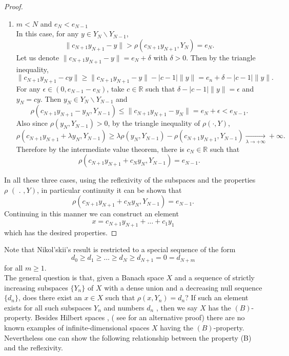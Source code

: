 \documentclass[12pt, reqno]{amsart}
\theoremstyle{definition}
\theoremstyle{remark}
\numberwithin{equation}{section}
\begin{document}
\begin{proof}
\begin{enumerate}
In this case, taking $c_N=1$, we directly get
$$
\rho(c_{N+1}y_{N+1} + c_Ny_N, Y_N ) = \rho(c_{N+1}y_{N+1} + y_N, Y_N )=e_N=e_{N-1}.
$$
\item $m < N$ and $e_N < e_{N-1}$\\

In this case, for any $y\in Y_N\backslash Y_{N-1}$, 
$$
\|c_{N+1}y_{N+1}-y\|>\rho(c_{N+1}y_{N+1},Y_N)=e_N.
$$
Let us denote $\|c_{N+1}y_{N+1}-y\|=e_N+\delta$ with $\delta>0$. Then by the triangle inequality,
$$
\|c_{N+1}y_{N+1}-cy\|\ge \|c_{N+1}y_{N+1}-y\|-|c-1|\|y\|=e_n+\delta-|c-1|\|y\|.
$$
For any $\epsilon\in(0,e_{N-1}-e_N)$, take $c\in\mathbb R$ such that $\delta-|c-1|\|y\|=\epsilon$ and $y_N=cy$.  
Then $y_N\in Y_N\backslash Y_{N-1}$ and
$$
\rho(c_{N+1}y_{N+1}-y_N,Y_{N-1})\le \|c_{N+1}y_{N+1}-y_N\|=e_N+\epsilon<e_{N-1}.
$$
Also since $\rho(y_N, Y_{N-1} )>0$, by the triangle inequality of $\rho(\cdot,Y)$, 
$$
 \rho(c_{N+1}y_{N+1}+\lambda y_N, Y_{N-1} )\ge  \lambda \rho(y_N, Y_{N-1} )- \rho(c_{N+1}y_{N+1}, Y_{N-1} )\xrightarrow[\lambda\to+\infty]{}+\infty.
$$
Therefore by the intermediate value theorem, there is $c_{N}\in\mathbb R$ such that
$$
\rho(c_{N+1}y_{N+1}+c_N y_N, Y_{N-1} )=e_{N-1}.
$$
\end{enumerate}

In all these three cases, using  the reflexivity of the subspaces  and the properties  $\rho\,\,(\,\, .\,\, , Y)$,  in particular continuity  it can be shown that $$\rho(c_{N+1} y_{N+1}+c_Ny_N, Y_{N-1} )= e_{N-1}.$$ Continuing in this manner we can construct an element $$x =c_{N+1} y_{N+1}+\dots+c_1y_1$$ which has the desired properties.
\end{proof}
 Note that Nikol'skii's result is  restricted to a special sequence of the form
 $$d_0\geq d_1\geq \dots  \geq d_N \geq d_{N+1} =0 =d_{N+m}$$ for all $m\geq 1$.\\
 
  The general question is that, given a Banach space $X$ and a sequence of strictly increasing subspaces $\{Y_n\}$ of $X$  with a dense union and a decreasing null sequence $ \{d_n\}$, does there exist an $x\in X$ such that $\rho(x, Y_n) =d_n$? If such an element exists for all such subspaces $Y_n$ and numbers $d_n$ , then we say $X$ has the $(B)$-property. Besides Hilbert spaces \cite{Tyu2}, ( see \cite{AL} for an alternative proof)  there are no known examples of infinite-dimensional  spaces $X$ having the $(B)$-property. Nevertheless one can show the following relationship between the property (B) and the reflexivity.
\end{document}
